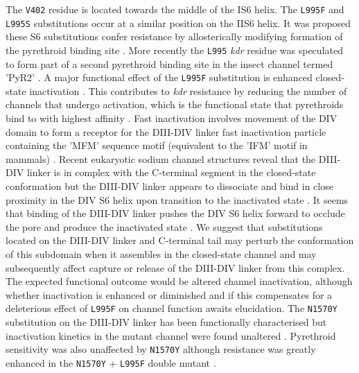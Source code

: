 \documentclass[a4paper,11pt,abstracton,hidelinks]{scrartcl}
\begin{document}
%
The \texttt{V402} residue is located towards the middle of the IS6 helix.
%
The \texttt{L995F} and \texttt{L995S} substitutions occur at a similar position on the IIS6 helix.
%
It was proposed these S6 substitutions confer resistance by allosterically modifying formation of the pyrethroid binding site \cite{OReilly2006}.
%
More recently the \texttt{L995} \textit{kdr} residue was speculated to form part of a second pyrethroid binding site in the insect channel termed 'PyR2' \cite{Du2013, Du2015}.
%
A major functional effect of the \texttt{L995F} substitution is enhanced closed-state inactivation  \cite{Vais2000}.
%
This contributes to \textit{kdr} resistance by reducing the number of channels that undergo activation, which is the functional state that pyrethroids bind to with highest affinity \cite{Vais2000}.
%
Fast inactivation involves movement of the DIV domain to form a receptor for the DIII-DIV linker fast inactivation particle containing the 'MFM' sequence motif (equivalent to the 'IFM' motif in mammals) \cite{Capes2013, Dong2014}.
%
Recent eukaryotic sodium channel structures reveal that the DIII-DIV linker is in complex with the C-terminal segment in the closed-state conformation but the DIII-DIV linker appears to dissociate and bind in close proximity in the DIV S6 helix upon transition to the inactivated state \cite{Shen2017, Yan2017}.
%
It seems that binding of the DIII-DIV linker pushes the DIV S6 helix forward to occlude the pore and produce the inactivated state \cite{Yan2017}.
%
We suggest that substitutions located on the DIII-DIV linker and C-terminal tail may perturb the conformation of this subdomain when it assembles in the closed-state channel and may subsequently affect capture or release of the DIII-DIV linker from this complex.
%
The expected functional outcome would be altered channel inactivation, although whether inactivation is enhanced or diminished and if this compensates for a deleterious effect of \texttt{L995F} on channel function awaits elucidation.
%
The \texttt{N1570Y} substitution on the DIII-DIV linker has been functionally characterised but inactivation kinetics in the mutant channel were found unaltered \cite{Wang2015}.
%
Pyrethroid sensitivity was also unaffected by \texttt{N1570Y} although resistance was greatly enhanced in the \texttt{N1570Y} + \texttt{L995F} double mutant \cite{Wang2015}.
%
\end{document}
